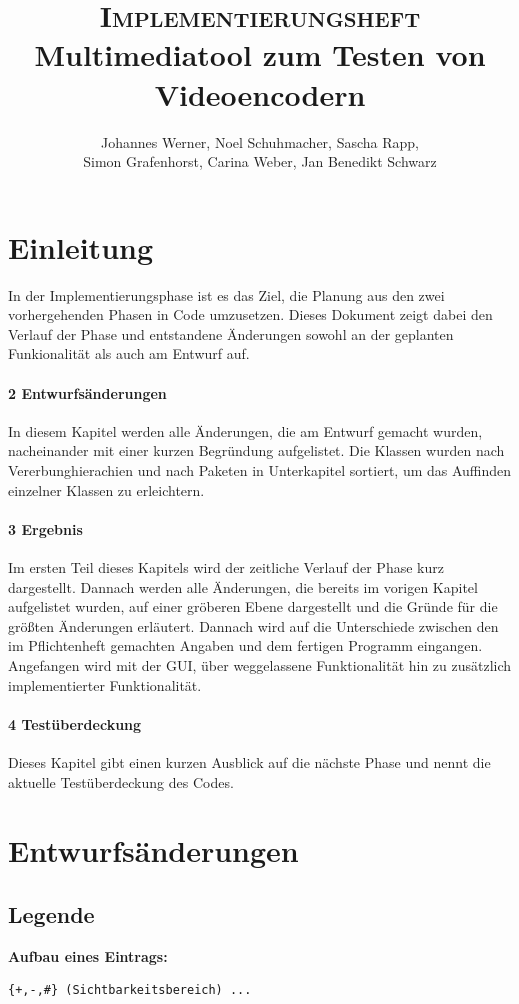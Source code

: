 \documentclass{scrartcl}
\title{\fontsize{40}{48} \selectfont \textsc{Implementierungsheft}\\
{\fontsize{18}{18} \selectfont Multimediatool zum Testen von Videoencodern}}}
\author {Johannes Werner, Noel Schuhmacher, Sascha Rapp,\\ Simon Grafenhorst,
Carina Weber, Jan Benedikt Schwarz}
\begin{document}
 {
\maketitle
\thispagestyle{empty}
\pagestyle{empty}
\newpage
\setcounter{page}{0}
\tableofcontents
\clearpage
\pagestyle{plain}
\newpage
\setcounter{page}{1}
\section{Einleitung}
In der Implementierungsphase ist es das Ziel, die Planung aus den zwei vorhergehenden Phasen in Code umzusetzen. Dieses Dokument zeigt dabei den Verlauf der Phase und entstandene Änderungen sowohl an der geplanten Funkionalität als auch am Entwurf auf.
\bigskip
\paragraph{2 Entwurfsänderungen} In diesem Kapitel werden alle Änderungen, die am Entwurf gemacht wurden, nacheinander mit einer kurzen Begründung aufgelistet. Die Klassen wurden nach Vererbunghierachien und nach Paketen in Unterkapitel sortiert, um das Auffinden einzelner Klassen zu erleichtern.
\paragraph{3 Ergebnis} Im ersten Teil dieses Kapitels wird der zeitliche Verlauf der Phase kurz dargestellt. Dannach werden alle Änderungen, die bereits im vorigen Kapitel aufgelistet wurden, auf einer gröberen Ebene dargestellt und die Gründe für die größten Änderungen erläutert. Dannach wird auf die Unterschiede zwischen den im Pflichtenheft gemachten Angaben und dem fertigen Programm eingangen. Angefangen wird mit der GUI, über weggelassene Funktionalität hin zu zusätzlich implementierter Funktionalität.
\paragraph{4 Testüberdeckung} Dieses Kapitel gibt einen kurzen Ausblick auf die nächste Phase und nennt die aktuelle Testüberdeckung des Codes.
\newpage
\section{Entwurfsänderungen}
\subsection{Legende}
\bigskip
\textbf{Aufbau eines Eintrags:}
\begin{verbatim}
{+,-,#} (Sichtbarkeitsbereich) ...


\end{verbatim}}
\end{document}
